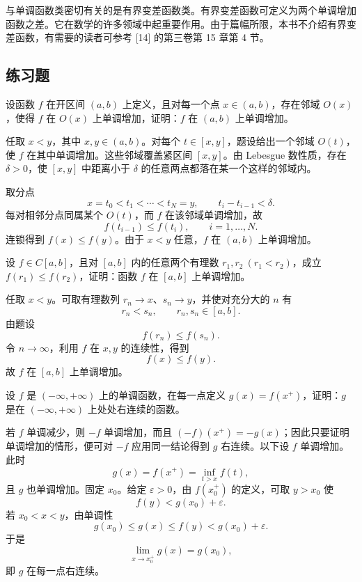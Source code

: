\begin{xremark}
与单调函数类密切有关的是有界变差函数类。有界变差函数可定义为两个单调增加函数之差。它在数学的许多领域中起重要作用。由于篇幅所限，本书不介绍有界变差函数，有需要的读者可参考 [14] 的第三卷第 15 章第 4 节。
\end{xremark}

\subsection{练习题}

\begin{xexercise}[1]
设函数 $f$ 在开区间 $(a,b)$ 上定义，且对每一个点 $x\in(a,b)$，存在邻域 $O(x)$，使得 $f$ 在 $O(x)$ 上单调增加，证明：$f$ 在 $(a,b)$ 上单调增加。
\end{xexercise}
\begin{xsolution}
任取 $x<y$，其中 $x,y\in(a,b)$。对每个 $t\in[x,y]$，题设给出一个邻域 $O(t)$，使 $f$ 在其中单调增加。这些邻域覆盖紧区间 $[x,y]$。由 Lebesgue 数性质，存在 $\delta>0$，使 $[x,y]$ 中距离小于 $\delta$ 的任意两点都落在某一个这样的邻域内。

取分点
\[
 x=t_0<t_1<\cdots<t_N=y,
 \qquad t_i-t_{i-1}<\delta.
\]
每对相邻分点同属某个 $O(t)$，而 $f$ 在该邻域单调增加，故
\[
 f(t_{i-1})\le f(t_i),\qquad i=1,\ldots,N.
\]
连锁得到 $f(x)\le f(y)$。由于 $x<y$ 任意，$f$ 在 $(a,b)$ 上单调增加。
\end{xsolution}


\begin{xexercise}[2]
设 $f\in C[a,b]$，且对 $[a,b]$ 内的任意两个有理数 $r_1,r_2\ (r_1<r_2)$，成立 $f(r_1)\le f(r_2)$，证明：函数 $f$ 在 $[a,b]$ 上单调增加。
\end{xexercise}
\begin{xsolution}
任取 $x<y$。可取有理数列 $r_n\to x$、$s_n\to y$，并使对充分大的 $n$ 有
\[
 r_n<s_n,
 \qquad r_n,s_n\in[a,b].
\]
由题设
\[
 f(r_n)\le f(s_n).
\]
令 $n\to\infty$，利用 $f$ 在 $x,y$ 的连续性，得到
\[
 f(x)\le f(y).
\]
故 $f$ 在 $[a,b]$ 上单调增加。
\end{xsolution}


\begin{xexercise}[3]
设 $f$ 是 $(-\infty,+\infty)$ 上的单调函数，在每一点定义 $g(x)=f(x^+)$，证明：$g$ 是在 $(-\infty,+\infty)$ 上处处右连续的函数。
\end{xexercise}
\begin{xsolution}
若 $f$ 单调减少，则 $-f$ 单调增加，而且 $(-f)(x^+)=-g(x)$；因此只要证明单调增加的情形，便可对 $-f$ 应用同一结论得到 $g$ 右连续。以下设 $f$ 单调增加。此时
\[
 g(x)=f(x^+)=\inf_{t>x}f(t),
\]
且 $g$ 也单调增加。固定 $x_0$。给定 $\varepsilon>0$，由 $f(x_0^+)$ 的定义，可取 $y>x_0$ 使
\[
 f(y)<g(x_0)+\varepsilon.
\]
若 $x_0<x<y$，由单调性
\[
 g(x_0)\le g(x)\le f(y)<g(x_0)+\varepsilon.
\]
于是
\[
 \lim_{x\to x_0^+}g(x)=g(x_0),
\]
即 $g$ 在每一点右连续。
\end{xsolution}


